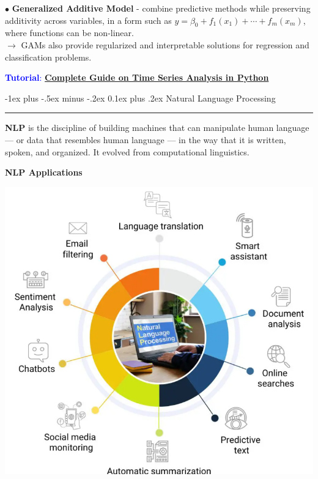 \documentclass[letterpaper, 10.5pt,landscape]{article}
\makeatletter
\renewcommand{\section}{\@startsection{section}{1}{0mm}%
                                {-1ex plus -.5ex minus -.2ex}%
                                {0.1ex plus .2ex}%
                                {\normalfont\small}}
\makeatother
\begin{document}
\begin{multicols*}{3}
$\bullet$ \textbf{Generalized Additive Model} - combine predictive methods while preserving additivity across variables, in a form such as
$y = \beta_0 + f_1(x_1) + \cdots + f_m(x_m)$, where functions can be non-linear. \\
$\rightarrow$ GAMs also provide regularized and interpretable solutions for regression and classification problems.


\vspace{5pt}
\textcolor{blue}{\textbf{Tutorial}:} \href{https://www.kaggle.com/code/prashant111/complete-guide-on-time-series-analysis-in-python}{\textbf{Complete Guide on Time Series Analysis in Python}}




\vspace*{\fill}


\section{Natural Language Processing} {\color{teal}\hrule height 1pt} \smallskip


\textbf{NLP} is the discipline of building machines that can manipulate human language — or data that resembles human language — in the way that it is written, spoken, and organized. It evolved from computational linguistics.


\textbf{NLP Applications}
\vspace{-7pt}
\begin{center}
    \begin{minipage}{0.86\linewidth}
    \includegraphics[width=\textwidth]{figures/nlp_application.png}
    \end{minipage}
\end{center}
\vspace{-7pt}




\end{multicols*}
\end{document}
